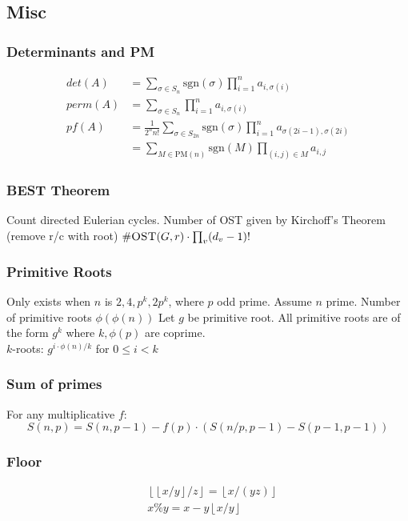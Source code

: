 \documentclass[8pt,a4paper,landscape,oneside]{amsart}
\begin{document}
\begin{multicols*}{3}
        \subsection{Misc}
            \subsubsection{Determinants and PM}
                \begin{align*}
                    det(A) &= \sum_{\sigma \in S_n}\text{sgn}(\sigma)\prod_{i = 1}^n a_{i,\sigma(i)}\\
                    perm(A) &= \sum_{\sigma \in S_n} \prod_{i = 1}^n a_{i,\sigma(i)}\\
                    pf(A) &= \frac{1}{2^nn!}\sum_{\sigma \in S_{2n}} \text{sgn}(\sigma)\prod_{i = 1}^n a_{\sigma(2i-1),\sigma(2i)}\\ &= \sum_{M \in \text{PM}(n)} \text{sgn}(M) \prod_{(i,j) \in M} a_{i,j}
                \end{align*}

            \subsubsection{BEST Theorem}
                Count directed Eulerian cycles. Number of OST given by
                Kirchoff's Theorem (remove r/c with root) $\#\textsc{OST}(G,r)
                \cdot \prod_{v}(d_v-1)!$

            \subsubsection{Primitive Roots}
                Only exists when $n$ is $2, 4, p^k, 2p^k$, where $p$ odd prime. Assume
                $n$ prime. Number of primitive roots $\phi(\phi(n))$
                Let $g$ be primitive root. All primitive roots are of the form $g^k$
                where $k,\phi(p)$ are coprime.\\ $k$-roots:
                $g^{i \cdot \phi(n) / k}$ for $0 \leq i < k$

            \subsubsection{Sum of primes} For any multiplicative $f$:
                \[
                    S(n,p) = S(n, p-1) - f(p) \cdot (S(n/p,p-1) - S(p-1,p-1))
                \]

            \subsubsection{Floor}
                \begin{align*}
                    &\left\lfloor \left\lfloor x/y \right\rfloor / z \right\rfloor = \left\lfloor x / (yz) \right\rfloor \\
                    &x \% y = x - y \left\lfloor x / y \right\rfloor
                \end{align*}




\end{multicols*}
\end{document}

